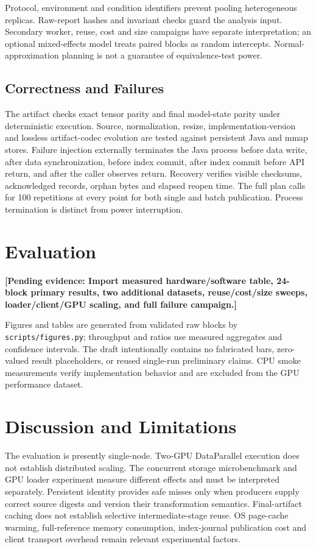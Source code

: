 \documentclass[journal]{IEEEtran}
\newcommand{\pending}[1]{\textbf{[Pending evidence: #1]}}
\begin{document}
Protocol, environment and condition identifiers prevent pooling heterogeneous replicas. Raw-report hashes and invariant checks guard the analysis input. Secondary worker, reuse, cost and size campaigns have separate interpretation; an optional mixed-effects model treats paired blocks as random intercepts. Normal-approximation planning is not a guarantee of equivalence-test power.

\subsection{Correctness and Failures}
The artifact checks exact tensor parity and final model-state parity under deterministic execution. Source, normalization, resize, implementation-version and lossless artifact-codec evolution are tested against persistent Java and mmap stores. Failure injection externally terminates the Java process before data write, after data synchronization, before index commit, after index commit before API return, and after the caller observes return. Recovery verifies visible checksums, acknowledged records, orphan bytes and elapsed reopen time. The full plan calls for 100 repetitions at every point for both single and batch publication. Process termination is distinct from power interruption.

\section{Evaluation}
\pending{Import measured hardware/software table, 24-block primary results, two additional datasets, reuse/cost/size sweeps, loader/client/GPU scaling, and full failure campaign.}

Figures and tables are generated from validated raw blocks by \texttt{scripts/figures.py}; throughput and ratios use measured aggregates and confidence intervals. The draft intentionally contains no fabricated bars, zero-valued result placeholders, or reused single-run preliminary claims. CPU smoke measurements verify implementation behavior and are excluded from the GPU performance dataset.

\section{Discussion and Limitations}
The evaluation is presently single-node. Two-GPU DataParallel execution does not establish distributed scaling. The concurrent storage microbenchmark and GPU loader experiment measure different effects and must be interpreted separately. Persistent identity provides safe misses only when producers supply correct source digests and version their transformation semantics. Final-artifact caching does not establish selective intermediate-stage reuse. OS page-cache warming, full-reference memory consumption, index-journal publication cost and client transport overhead remain relevant experimental factors.
\end{document}
